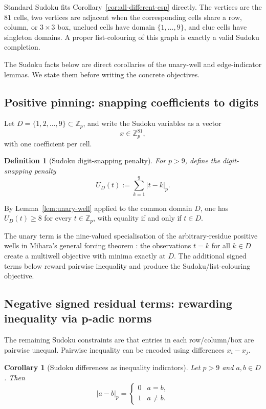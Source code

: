 \documentclass[11pt]{article}
\newtheorem{corollary}[theorem]{Corollary}
\newtheorem{definition}{Definition}
\begin{document}
Standard Sudoku fits Corollary~\ref{cor:all-different-csp} directly. The vertices are the $81$ cells, two vertices are adjacent when the corresponding cells share a row, column, or $3\times 3$ box, unclued cells have domain $\{1,\dots,9\}$, and clue cells have singleton domains. A proper list-colouring of this graph is exactly a valid Sudoku completion.

The Sudoku facts below are direct corollaries of the unary-well and edge-indicator lemmas. We state them before writing the concrete objectives.

\subsection{Positive pinning: snapping coefficients to digits}

Let $D=\{1,2,\dots,9\}\subset \mathbb{Z}_p$, and write the Sudoku variables as a vector
\[
x \in \mathbb{Z}_p^{81},
\]
with one coefficient per cell.

\begin{definition}[Sudoku digit-snapping penalty]
For $p>9$, define the digit-snapping penalty
\[
U_D(t) := \sum_{k=1}^9 |t-k|_p.
\]
\end{definition}

By Lemma~\ref{lem:unary-well} applied to the common domain \(D\), one has \(U_D(t)\ge 8\) for every \(t\in\mathbb Z_p\), with equality if and only if \(t\in D\).

The unary term is the nine-valued specialisation of the arbitrary-residue positive wells in Mihara's general forcing theorem \cite{mihara2026forcing}: the observations $t=k$ for all $k\in D$ create a multiwell objective with minima exactly at $D$. The additional signed terms below reward pairwise inequality and produce the Sudoku/list-colouring objective.

\subsection{Negative signed residual terms: rewarding inequality via p-adic norms}

The remaining Sudoku constraints are that entries in each row/column/box are pairwise unequal. Pairwise inequality can be encoded using differences $x_i-x_j$.

\begin{corollary}[Sudoku differences as inequality indicators]
\label{cor:sudoku-differences}
Let $p>9$ and $a,b\in D$. Then
\[
|a-b|_p =
\begin{cases}
0 & a=b,\\
1 & a\neq b.
\end{cases}
\]
\end{corollary}
\end{document}
